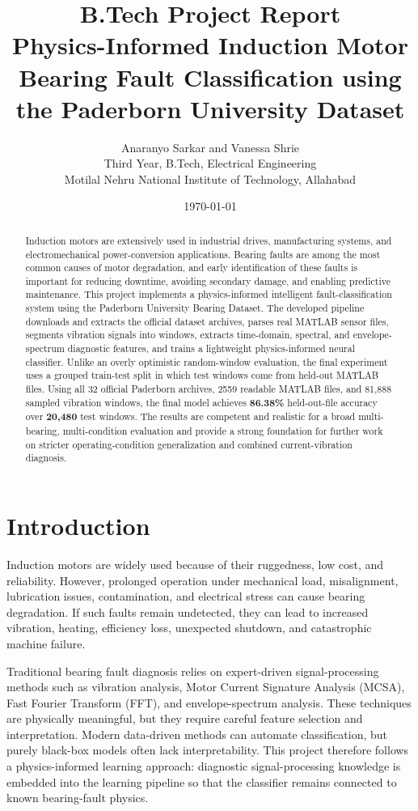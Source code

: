 \documentclass[11pt,a4paper]{article}
\title{\textbf{B.Tech Project Report}\\[0.35em]
Physics-Informed Induction Motor Bearing Fault Classification using the Paderborn University Dataset}
\author{
\begin{tabular}{c}
Anaranyo Sarkar \quad and \quad Vanessa Shrie\\
\small Third Year, B.Tech, Electrical Engineering\\
\small Motilal Nehru National Institute of Technology, Allahabad
\end{tabular}
}
\date{\today}
\begin{document}
\maketitle

\begin{abstract}
Induction motors are extensively used in industrial drives, manufacturing systems, and electromechanical power-conversion applications. Bearing faults are among the most common causes of motor degradation, and early identification of these faults is important for reducing downtime, avoiding secondary damage, and enabling predictive maintenance. This project implements a physics-informed intelligent fault-classification system using the Paderborn University Bearing Dataset. The developed pipeline downloads and extracts the official dataset archives, parses real MATLAB sensor files, segments vibration signals into windows, extracts time-domain, spectral, and envelope-spectrum diagnostic features, and trains a lightweight physics-informed neural classifier. Unlike an overly optimistic random-window evaluation, the final experiment uses a grouped train-test split in which test windows come from held-out MATLAB files. Using all 32 official Paderborn archives, 2559 readable MATLAB files, and 81,888 sampled vibration windows, the final model achieves \textbf{86.38\%} held-out-file accuracy over \textbf{20,480} test windows. The results are competent and realistic for a broad multi-bearing, multi-condition evaluation and provide a strong foundation for further work on stricter operating-condition generalization and combined current-vibration diagnosis.
\end{abstract}

\tableofcontents
\newpage

\section{Introduction}
Induction motors are widely used because of their ruggedness, low cost, and reliability. However, prolonged operation under mechanical load, misalignment, lubrication issues, contamination, and electrical stress can cause bearing degradation. If such faults remain undetected, they can lead to increased vibration, heating, efficiency loss, unexpected shutdown, and catastrophic machine failure.

Traditional bearing fault diagnosis relies on expert-driven signal-processing methods such as vibration analysis, Motor Current Signature Analysis (MCSA), Fast Fourier Transform (FFT), and envelope-spectrum analysis. These techniques are physically meaningful, but they require careful feature selection and interpretation. Modern data-driven methods can automate classification, but purely black-box models often lack interpretability. This project therefore follows a physics-informed learning approach: diagnostic signal-processing knowledge is embedded into the learning pipeline so that the classifier remains connected to known bearing-fault physics.
\end{document}
